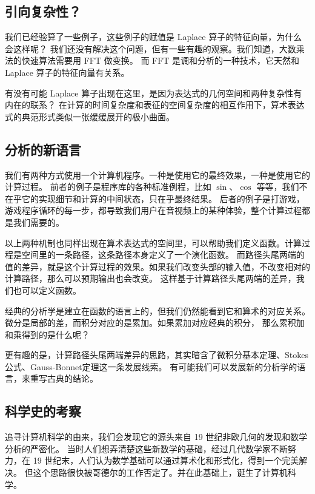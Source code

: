 \documentclass[a4paper,12pt]{article}
\numberwithin{definition}{section}
\numberwithin{lemma}{section}
\numberwithin{proposition}{section}
\numberwithin{theorem}{section}
\numberwithin{grammar}{section}
\numberwithin{program}{section}
\numberwithin{convention}{section}
\numberwithin{corollary}{section}
\begin{document}
\subsection{引向复杂性？}

我们已经验算了一些例子，这些例子的赋值是 Laplace 算子的特征向量，为什么会这样呢？
我们还没有解决这个问题，但有一些有趣的观察。我们知道，大数乘法的快速算法需要用 FFT 做变换。
而 FFT 是调和分析的一种技术，它天然和 Laplace 算子的特征向量有关系。

有没有可能 Laplace 算子出现在这里，是因为表达式的几何空间和两种复杂性有内在的联系？
在计算的时间复杂度和表征的空间复杂度的相互作用下，算术表达式的典范形式类似一张缓缓展开的极小曲面。

\subsection{分析的新语言}

我们有两种方式使用一个计算机程序。一种是使用它的最终效果，一种是使用它的计算过程。
前者的例子是程序库的各种标准例程，比如 $\sin$、$\cos$ 等等，我们不在乎它的实现细节和计算的中间状态，只在乎最终结果。
后者的例子是打游戏，游戏程序循环的每一步，都导致我们用户在音视频上的某种体验，整个计算过程都是我们需要的。

以上两种机制也同样出现在算术表达式的空间里，可以帮助我们定义函数。计算过程是空间里的一条路径，这条路径本身定义了一个演化函数。
而路径头尾两端的值的差异，就是这个计算过程的效果。如果我们改变头部的输入值，不改变相对的计算路径，那么可以预期输出也会改变。
这样基于计算路径头尾两端的差异，我们也可以定义函数。

经典的分析学是建立在函数的语言上的，但我们仍然能看到它和算术的对应关系。微分是局部的差，而积分对应的是累加。如果累加对应经典的积分，
那么累积加和乘得到的是什么呢？

更有趣的是，计算路径头尾两端差异的思路，其实暗含了微积分基本定理、Stokes公式、Gauss-Bonnet定理这一条发展线索。
有可能我们可以发展新的分析学的语言，来重写古典的结论。

\subsection{科学史的考察}

追寻计算机科学的由来，我们会发现它的源头来自 19 世纪非欧几何的发现和数学分析的严密化。
当时人们想弄清楚这些新数学的基础，经过几代数学家不断努力，在 19 世纪末，人们认为数学基础可以通过算术化和形式化，得到一个完美解决。
但这个思路很快被哥德尔的工作否定了。并在此基础上，诞生了计算机科学。
\end{document}
